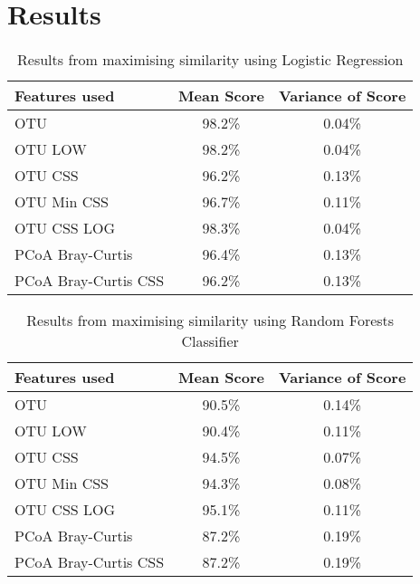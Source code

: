\chapter{Results}

\ifpdf
    \graphicspath{{Chapter3/Figs/Raster/}{Chapter3/Figs/PDF/}{Chapter3/Figs/}}
\else
    \graphicspath{{Chapter3/Figs/Vector/}{Chapter3/Figs/}}
\fi
\begin{table}
\caption{Results from maximising similarity using Logistic Regression}
\centering
\label{table:lrsimilarity}
\begin{tabular}{l c  c}
\hline 
Features used & Mean Score & Variance of Score \\ 
 
\hline
OTU & 98.2\% & 0.04\%   \\
OTU LOW &98.2\% &0.04\%\\
OTU CSS & 96.2\% & 0.13\%   \\
OTU Min CSS & 96.7\% & 0.11\%   \\
OTU CSS LOG & 98.3\% & 0.04\% \\
PCoA Bray-Curtis &96.4\% & 0.13\%   \\
PCoA Bray-Curtis CSS &96.2\% & 0.13\%   \\

\hline 
\end{tabular}
\end{table}
\begin{table}
	\caption{Results from maximising similarity using Random Forests Classifier}
	\centering
	\label{table:rfrsimilarity}
	\begin{tabular}{l c  c}
		\hline 
		Features used & Mean Score & Variance of Score \\ 
		
		\hline
		OTU & 90.5\% & 0.14\%   \\
		OTU LOW& 90.4\% &0.11\% \\
		OTU CSS & 94.5\% & 0.07\%   \\
		OTU Min CSS & 94.3\% & 0.08\%   \\
		OTU CSS LOG & 95.1\% & 0.11\% \\
		PCoA Bray-Curtis &87.2\% & 0.19\%   \\
		PCoA Bray-Curtis CSS &87.2\% & 0.19\%   \\
		
		\hline 
	\end{tabular}
\end{table}


